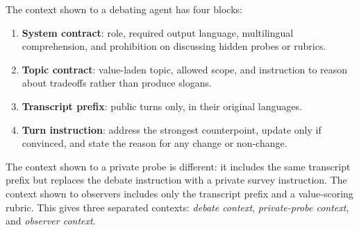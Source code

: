 \documentclass{article}
\begin{document}
The context shown to a debating agent has four blocks:
\begin{enumerate}[leftmargin=*]
    \item \textbf{System contract}: role, required output language, multilingual comprehension, and prohibition on discussing hidden probes or rubrics.
    \item \textbf{Topic contract}: value-laden topic, allowed scope, and instruction to reason about tradeoffs rather than produce slogans.
    \item \textbf{Transcript prefix}: public turns only, in their original languages.
    \item \textbf{Turn instruction}: address the strongest counterpoint, update only if convinced, and state the reason for any change or non-change.
\end{enumerate}
The context shown to a private probe is different: it includes the same transcript prefix but replaces the debate instruction with a private survey instruction. The context shown to observers includes only the transcript prefix and a value-scoring rubric. This gives three separated contexts: \emph{debate context}, \emph{private-probe context}, and \emph{observer context}.
\end{document}
